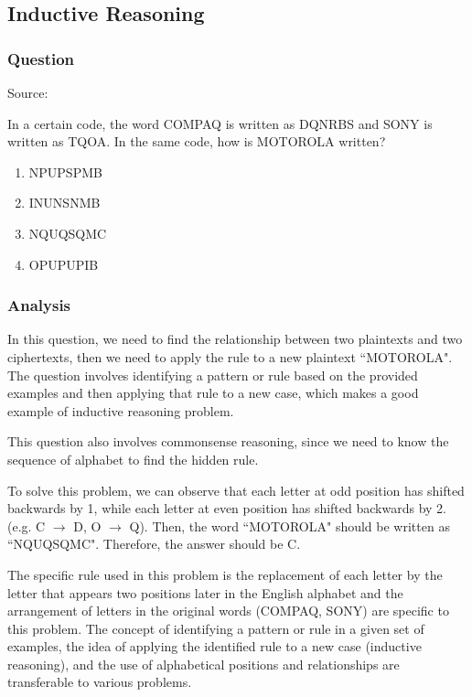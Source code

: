 \documentclass[12pt, a4paper]{article}
\begin{document}
\subsection*{Inductive Reasoning}
\subsubsection*{Question}
Source: \cite{Bhatia_2023b}

In a certain code, the word COMPAQ is written as DQNRBS and SONY is written as TQOA. In the same code, how is MOTOROLA written?

\begin{enumerate}[label=(\Alph*)]
    \item NPUPSPMB
    \item INUNSNMB
    \item NQUQSQMC
    \item OPUPUPIB
\end{enumerate}

\subsubsection*{Analysis}
In this question, we need to find the relationship between two plaintexts and two ciphertexts, then we need to apply the rule to a new plaintext ``MOTOROLA". The question involves identifying a pattern or rule based on the provided examples and then applying that rule to a new case, which makes a good example of inductive reasoning problem.

This question also involves commonsense reasoning, since we need to know the sequence of alphabet to find the hidden rule.

To solve this problem, we can observe that each letter at odd position has shifted backwards by 1, while each letter at even position has shifted backwards by 2. (e.g. C $\rightarrow$ D, O $\rightarrow$ Q). Then, the word ``MOTOROLA" should be written as ``NQUQSQMC". Therefore, the answer should be C.

The specific rule used in this problem is the replacement of each letter by the letter that appears two positions later in the English alphabet and the arrangement of letters in the original words (COMPAQ, SONY) are specific to this problem. The concept of identifying a pattern or rule in a given set of examples, the idea of applying the identified rule to a new case (inductive reasoning), and the use of alphabetical positions and relationships are transferable to various problems.
\end{document}
